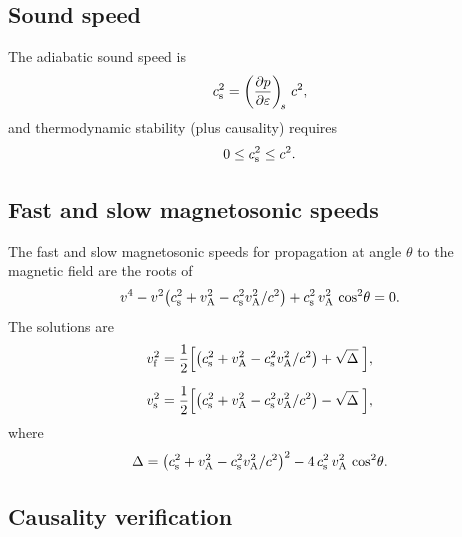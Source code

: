 \subsection{Sound speed}

The adiabatic sound speed is
\begin{equation}
  c_{\mathrm{s}}^{2} = \left(\frac{\partial p}{\partial\varepsilon}\right)_{\!s}\,c^{2},
  \label{eq:cs-rel}
\end{equation}
and thermodynamic stability (plus causality) requires
\begin{equation}
  0 \le c_{\mathrm{s}}^{2} \le c^{2}.
  \label{eq:cs-bound}
\end{equation}

\subsection{Fast and slow magnetosonic speeds}

The fast and slow magnetosonic speeds for propagation at angle $\theta$
to the magnetic field are the roots of
\begin{equation}
  v^{4} - v^{2}\bigl(c_{\mathrm{s}}^{2} + v_{\mathrm{A}}^{2}
    - c_{\mathrm{s}}^{2}v_{\mathrm{A}}^{2}/c^{2}\bigr)
  + c_{\mathrm{s}}^{2}\,v_{\mathrm{A}}^{2}\,\cos^{2}\!\theta = 0.
  \label{eq:magnetosonic-dispersion}
\end{equation}
The solutions are
\begin{align}
  v_{\mathrm{f}}^{2}
  &= \frac{1}{2}\Bigl[\bigl(c_{\mathrm{s}}^{2}+v_{\mathrm{A}}^{2}
     -c_{\mathrm{s}}^{2}v_{\mathrm{A}}^{2}/c^{2}\bigr)
    + \sqrt{\Delta}\;\Bigr],
  \label{eq:vf}\\[6pt]
  v_{\mathrm{s}}^{2}
  &= \frac{1}{2}\Bigl[\bigl(c_{\mathrm{s}}^{2}+v_{\mathrm{A}}^{2}
     -c_{\mathrm{s}}^{2}v_{\mathrm{A}}^{2}/c^{2}\bigr)
    - \sqrt{\Delta}\;\Bigr],
  \label{eq:vs}
\end{align}
where
\begin{equation}
  \Delta
  = \bigl(c_{\mathrm{s}}^{2}+v_{\mathrm{A}}^{2}-c_{\mathrm{s}}^{2}v_{\mathrm{A}}^{2}/c^{2}\bigr)^{2}
    - 4\,c_{\mathrm{s}}^{2}\,v_{\mathrm{A}}^{2}\,\cos^{2}\!\theta.
  \label{eq:Delta}
\end{equation}

\subsection{Causality verification}

